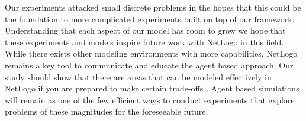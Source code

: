 \documentclass[12pt,letterpaper]{article}
\begin{document}
Our experiments attacked small discrete problems in the hopes that this could be the foundation to more complicated experiments built on top of our framework.  Understanding that each aspect of our model has room to grow we hope that these experiments and models inspire future work with NetLogo in this field.  While there exists other modeling environments with more capabilities, NetLogo remains a key tool to communicate and educate the agent based approach.  Our study should show that there are areas that can be modeled effectively in NetLogo if you are prepared to make certain trade-offs .  Agent based simulations will remain as one of the few efficient ways to conduct experiments that explore problems of these magnitudes for the foreseeable future.




\end{document}
